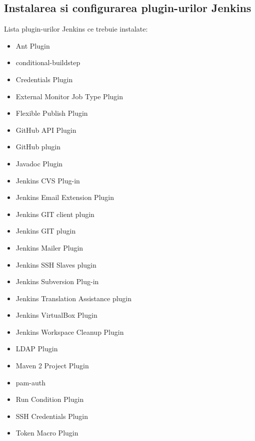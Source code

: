 \subsection{Instalarea si configurarea plugin-urilor Jenkins}
Lista plugin-urilor Jenkins ce trebuie instalate:
\begin{itemize}
\item 
Ant Plugin
\item
conditional-buildstep
\item
Credentials Plugin
\item
External Monitor Job Type Plugin
\item
Flexible Publish Plugin
\item
GitHub API Plugin
\item
GitHub plugin
\item
Javadoc Plugin
\item
Jenkins CVS Plug-in
\item
Jenkins Email Extension Plugin
\item
Jenkins GIT client plugin
\item
Jenkins GIT plugin
\item
Jenkins Mailer Plugin
\item
Jenkins SSH Slaves plugin
\item
Jenkins Subversion Plug-in
\item
Jenkins Translation Assistance plugin
\item
Jenkins VirtualBox Plugin
\item
Jenkins Workspace Cleanup Plugin
\item
LDAP Plugin
\item
Maven 2 Project Plugin
\item
pam-auth
\item
Run Condition Plugin
\item
SSH Credentials Plugin
\item
Token Macro Plugin
\end{itemize}

